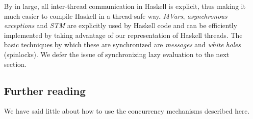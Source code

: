By in large, all inter-thread communication in Haskell is explicit, thus
making it much easier to compile Haskell in a thread-safe way.
\emph{MVars}, \emph{asynchronous exceptions} and \emph{STM} are
explicitly used by Haskell code and can be efficiently implemented by
taking advantage of our representation of Haskell threads.  The basic
techniques by which these are synchronized are \emph{messages} and
\emph{white holes} (spinlocks).  We defer the issue of synchronizing
lazy evaluation to the next section.

\subsection{Further reading}

We have said little about how to use the concurrency mechanisms described here. \XXX
